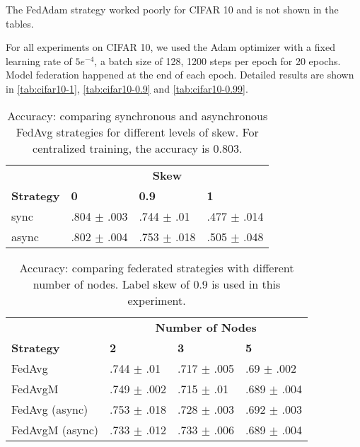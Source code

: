 \documentclass[twocolumn, switch]{article} %
\begin{document}
The FedAdam strategy worked poorly for CIFAR 10 and is not shown in the tables.

For all experiments on CIFAR 10, we used the Adam optimizer with a fixed learning rate of $5e^{-4}$, a batch size of 128, 1200 steps per epoch for 20 epochs. Model federation happened at the end of each epoch. Detailed results are shown in \autoref{tab:cifar10-1}, \autoref{tab:cifar10-0.9} and \autoref{tab:cifar10-0.99}.

\begin{table}[H]
\begin{center}
\begin{tabular}{l|lll}
 \toprule
    & \multicolumn{3}{c}{\textbf{Skew}} \\
    \textbf{Strategy} & \textbf{0} & \textbf{0.9} & \textbf{1}  \\
    \midrule
    
     sync & .804 $\pm$ .003 & .744 $\pm$ .01 & .477 $\pm$ .014 \\
    async & .802 $\pm$ .004 & .753 $\pm$ .018 & .505 $\pm$ .048 \\
    
    \bottomrule
   \end{tabular}
   \vspace{5pt}
\caption{Accuracy: comparing synchronous and asynchronous FedAvg strategies for different levels of skew. For centralized training, the accuracy is 0.803.}
\label{tab:cifar10-1}
\end{center}
\end{table}




\begin{table}[ht]
    \centering
    \begin{tabular}{l|lll}
    \toprule
        & \multicolumn{3}{c}{\textbf{Number of Nodes}} \\
        \textbf{Strategy} & \textbf{2} & \textbf{3} & \textbf{5}  \\
        \midrule
        
        FedAvg & .744 $\pm$ .01 & .717 $\pm$ .005 & .69 $\pm$ .002 \\
        FedAvgM & .749 $\pm$ .002 & .715 $\pm$ .01 & .689 $\pm$ .004 \\
        \midrule

        FedAvg (async) & .753 $\pm$ .018 & .728 $\pm$ .003 & .692 $\pm$ .003 \\
        FedAvgM (async) & .733 $\pm$ .012 & .733 $\pm$ .006 & .689 $\pm$ .004 \\
        
        \bottomrule
    \end{tabular}
    \vspace{5pt}
    \caption{Accuracy: comparing federated strategies with different number of nodes. Label skew of 0.9 is used in this experiment.}
    \label{tab:cifar10-0.9}
\end{table}
\end{document}
